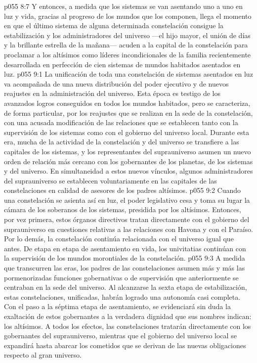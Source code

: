 \vs p055 8:7 \pc Y entonces, a medida que los sistemas se van asentando uno a uno en luz y vida, gracias al progreso de los mundos que los componen, llega el momento en que el último sistema de alguna determinada constelación consigue la estabilización y los administradores del universo ---el hijo mayor, el unión de días y la brillante estrella de la mañana--- acuden a la capital de la constelación para proclamar a los altísimos como líderes incondicionales de la familia recientemente desarrollada en perfección de cien sistemas de mundos habitados asentados en luz.
\vs p055 9:1 La unificación de toda una constelación de sistemas asentados en luz va acompañada de una nueva distribución del poder ejecutivo y de nuevos reajustes en la administración del universo. Esta época es testigo de los avanzados logros conseguidos en todos los mundos habitados, pero se caracteriza, de forma particular, por los reajustes que se realizan en la sede de la constelación, con una acusada modificación de las relaciones que se establecen tanto con la supervisión de los sistemas como con el gobierno del universo local. Durante esta era, mucha de la actividad de la constelación y del universo se transfiere a las capitales de los sistemas, y los representantes del suprauniverso asumen un nuevo orden de relación más cercano con los gobernantes de los planetas, de los sistemas y del universo. En simultaneidad a estos nuevos vínculos, algunos administradores del suprauniverso se establecen voluntariamente en las capitales de las constelaciones en calidad de asesores de los padres altísimos.
\vs p055 9:2 Cuando una constelación se asienta así en luz, el poder legislativo cesa y toma su lugar la cámara de los soberanos de los sistemas, presidida por los altísimos. Entonces, por vez primera, estos órganos directivos tratan directamente con el gobierno del suprauniverso en cuestiones relativas a las relaciones con Havona y con el Paraíso. Por lo demás, la constelación continúa relacionada con el universo igual que antes. De etapa en etapa de asentamiento en vida, los univitatias continúan con la supervisión de los mundos morontiales de la constelación.
\vs p055 9:3 A medida que transcurren las eras, los padres de las constelaciones asumen más y más las pormenorizadas funciones gobernativas o de supervisión que anteriormente se centraban en la sede del universo. Al alcanzarse la sexta etapa de estabilización, estas constelaciones, unificadas, habrán logrado una autonomía casi completa. Con el paso a la séptima etapa de asentamiento, se evidenciará sin duda la exaltación de estos gobernantes a la verdadera dignidad que sus nombres indican: los altísimos. A todos los efectos, las constelaciones tratarán directamente con los gobernantes del suprauniverso, mientras que el gobierno del universo local se expandirá hasta abarcar los cometidos que se derivan de las nuevas obligaciones respecto al gran universo.
